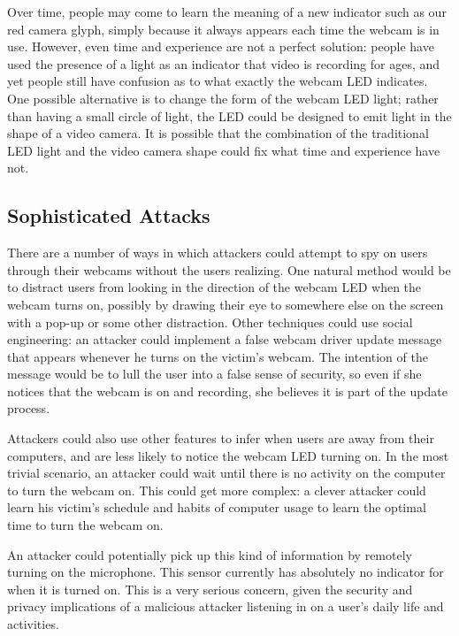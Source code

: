 \documentclass{sigchi}
\begin{document}
Over time, people may come to learn the meaning of a new indicator such as our red camera glyph, simply because it always appears each time the webcam is in use. However, even time and experience are not a perfect solution: people have used the presence of a light as an indicator that video is recording for ages, and yet people still have confusion as to what exactly the webcam LED indicates. One possible alternative is to change the form of the webcam LED light; rather than having a small circle of light, the LED could be designed to emit light in the shape of a video camera. It is possible that the combination of the traditional LED light and the video camera shape could fix what time and experience have not.

\subsection{Sophisticated Attacks}

There are a number of ways in which attackers could attempt to spy on users through their webcams without the users realizing. One natural method would be to distract users from looking in the direction of the webcam LED when the webcam turns on, possibly by drawing their eye to somewhere else on the screen with a pop-up or some other distraction. Other techniques could use social engineering: an attacker could implement a false webcam driver update message that appears whenever he turns on the victim's webcam. The intention of the message would be to lull the user into a false sense of security, so even if she notices that the webcam is on and recording, she believes it is part of the update process.

Attackers could also use other features to infer when users are away from their computers, and are less likely to notice the webcam LED turning on. In the most trivial scenario, an attacker could wait until there is no activity on the computer to turn the webcam on. This could get more complex: a clever attacker could learn his victim's schedule and habits of computer usage to learn the optimal time to turn the webcam on. 

An attacker could potentially pick up this kind of information by remotely turning on the microphone. This sensor currently has absolutely no indicator for when it is turned on. This is a very serious concern, given the security and privacy implications of a malicious attacker listening in on a user's daily life and activities.

\end{document}
